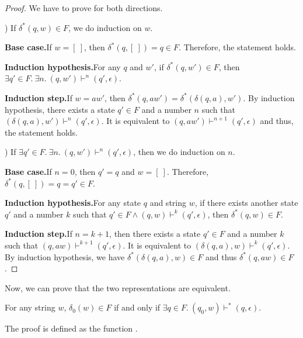 \begin{proof}
\noindent We have to prove for both directions. 

\par {}) If \(\delta^*(q,w) \in F\), we do induction on \(w\).
\par \textbf{Base case.}\quad If \(w = [\ ]\), then \(\delta^*(q,[\ ]) =
q \in F\). Therefore, the statement holds.
\par \textbf{Induction hypothesis.}\quad For any \(q\) and \(w'\), if
\(\delta^*(q,w') \in F\), then \(\exists q'\in F.\ \exists n.\ (q,w') \vdash^n (q',\epsilon)\).
\par \textbf{Induction step.}\quad If \(w = aw'\), then
\(\delta^*(q,aw') = \delta^*(\delta(q,a),w')\). By induction
hypothesis, there exists a state \(q' \in F\) and a number \(n\) such
that \((\delta(q,a),w') \vdash^n (q',\epsilon)\). It is equivalent to
\((q,aw') \vdash^{n+1} (q',\epsilon)\) and thus, the statement holds.

\par {}) If \(\exists q'\in F.\ \exists n.\ (q,w') \vdash^n
(q',\epsilon)\), then we do induction on \(n\).
\par \textbf{Base case.}\quad If \(n = 0\), then \(q' = q\) and \(w =
[\ ]\). Therefore, \(\delta^*(q,[\ ]) = q = q' \in F\). 
\par \textbf{Induction hypothesis.}\quad For any state \(q\) and
string \(w\), if
there exists another state \(q'\) and a number \(k\) such that \(q' \in F \wedge (q,w) \vdash^k
(q',\epsilon)\), then \(\delta^*(q,w) \in F\). 
\par \textbf{Induction step.}\quad If \(n = k + 1\), then there
exists a state \(q' \in F\) and a number \(k\) such that \((q,aw) \vdash^{k+1}
(q',\epsilon)\). It is equivalent to \((\delta(q,a),w) \vdash^k
(q',\epsilon)\). By induction hypothesis, we have
\(\delta^*(\delta(q,a),w) \in F\) and thus \(\delta^*(q,aw) \in F\). 
\end{proof} 

\par Now, we can prove that the two representations are equivalent. 

\begin{lem}
\label{lem:dec_iff2}
\noindent For any string
\(w\), \(\delta_0 (w) \in F\) if and only if \(\exists q\in F.\ (q_0,w) \vdash^* (q,\epsilon)\).
\end{lem}

\par The proof is defined as the function . 

